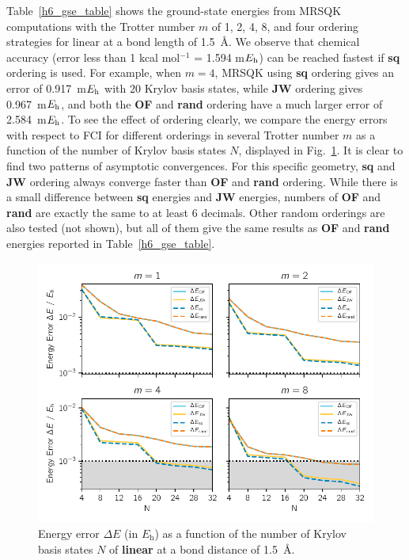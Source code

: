 \documentclass[journal=jctcce,manuscript=article]{achemso}
\newcommand*{\Eh}{$E_{\rm h}$\xspace}
\newcommand{\methodabbr}[0]{MRSQK\xspace}
\begin{document}
Table~\ref{h6_gse_table} shows the ground-state energies from \methodabbr computations with the Trotter number $m$ of 1, 2, 4, 8, and four ordering strategies for linear  at a bond length of 1.5~\AA.
We observe that chemical accuracy (error less than 1 kcal mol$^{-1}$ = 1.594 m\Eh) can be reached fastest if \textbf{sq} ordering is used. 
For example, when $m=4$, \methodabbr using \textbf{sq} ordering gives an error of 0.917~m\Eh with 20 Krylov basis states, while \textbf{JW} ordering gives 0.967~m\Eh, and both the \textbf{OF} and \textbf{rand} ordering have a much larger error of 2.584~m\Eh.
To see the effect of ordering clearly, we compare the energy errors with respect to FCI for different orderings in several Trotter number $m$ as a function of the number of Krylov basis states $N$, displayed in Fig.~\ref{h6_error-N}.
It is clear to find two patterns of asymptotic convergences. For this specific  geometry, \textbf{sq} and \textbf{JW} ordering always converge faster than \textbf{OF} and \textbf{rand} ordering. 
While there is a small difference between \textbf{sq} energies and \textbf{JW}  energies, numbers of \textbf{OF} and \textbf{rand}  are exactly the same to at least 6 decimals. 
Other random orderings are also tested (not shown), but all of them give the same results as \textbf{OF} and \textbf{rand} energies reported in Table~\ref{h6_gse_table}.
\begin{figure}[h!]
  \centering
  \includegraphics[width=4.5in]{figs/h6_error-N_order.pdf}
  \caption{Energy error $\Delta E$ (in $E_\mathrm{h}$) as a function of the number of Krylov basis states $N$ of \textbf{linear } at a bond distance of 1.5~\AA.
   }
\label{h6_error-N}
\end{figure}
\end{document}
